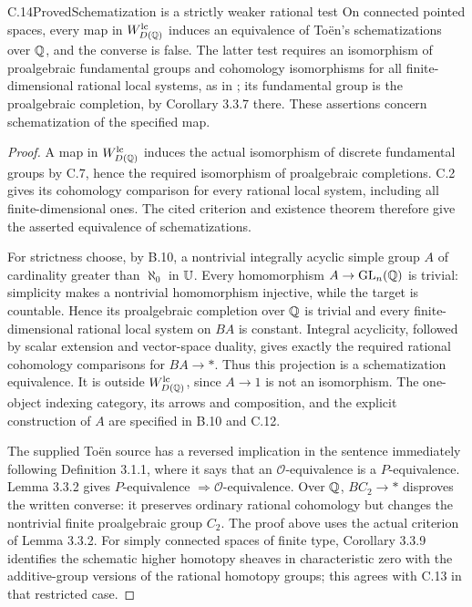 \begin{claim}{C.14}{Proved}{Schematization is a strictly weaker rational test}
On connected pointed spaces, every map in $W_{D(\mathbb Q)}^{\mathrm{lc}}$ induces an equivalence of To\"en's schematizations over $\mathbb Q$, and the converse is false.  The latter test requires an isomorphism of proalgebraic fundamental groups and cohomology isomorphisms for all finite-dimensional rational local systems, as in \citet[Lemma 3.3.2 and Theorem 3.3.4]{C_Toen2006}; its fundamental group is the proalgebraic completion, by Corollary 3.3.7 there.  These assertions concern schematization of the specified map.
\end{claim}
\begin{proof}
A map in $W_{D(\mathbb Q)}^{\mathrm{lc}}$ induces the actual isomorphism of discrete fundamental groups by C.7, hence the required isomorphism of proalgebraic completions.  C.2 gives its cohomology comparison for every rational local system, including all finite-dimensional ones.  The cited criterion and existence theorem therefore give the asserted equivalence of schematizations.

For strictness choose, by B.10, a nontrivial integrally acyclic simple group $A$ of cardinality greater than $\aleph_0$ in $\mathbb U$.  Every homomorphism $A\to\operatorname{GL}_n(\mathbb Q)$ is trivial: simplicity makes a nontrivial homomorphism injective, while the target is countable.  Hence its proalgebraic completion over $\mathbb Q$ is trivial and every finite-dimensional rational local system on $BA$ is constant.  Integral acyclicity, followed by scalar extension and vector-space duality, gives exactly the required rational cohomology comparisons for $BA\to *$.  Thus this projection is a schematization equivalence.  It is outside $W^{\mathrm{lc}}_{D(\mathbb Q)}$, since $A\to1$ is not an isomorphism.  The one-object indexing category, its arrows and composition, and the explicit construction of $A$ are specified in B.10 and C.12.

The supplied To\"en source has a reversed implication in the sentence immediately following Definition 3.1.1, where it says that an $\mathcal O$-equivalence is a $P$-equivalence.  Lemma 3.3.2 gives $P$-equivalence $\Rightarrow\mathcal O$-equivalence.  Over $\mathbb Q$, $BC_2\to *$ disproves the written converse: it preserves ordinary rational cohomology but changes the nontrivial finite proalgebraic group $C_2$.  The proof above uses the actual criterion of Lemma 3.3.2.  For simply connected spaces of finite type, Corollary 3.3.9 identifies the schematic higher homotopy sheaves in characteristic zero with the additive-group versions of the rational homotopy groups; this agrees with C.13 in that restricted case.
\end{proof}

